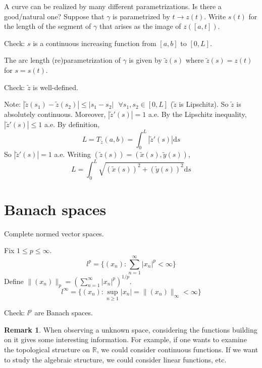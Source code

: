 \documentclass{article}
\newcommand{\sfa}{\text{  } \forall}
\theoremstyle{definition}
\newtheorem{rem}{Remark}
\begin{document}
A curve can be realized by many different parametrizations. Is there a good/natural one? Suppose that $\gamma$ is parametrized by $t \to z(t)$. Write $s(t)$ for the length of the segment of $\gamma$ that arises as the image of $z([a, t])$. 

\par Check: $s$ is a continuous increasing function from $[a, b]$ to $[0, L]$. 

\par The arc length (re)parametrization of $\gamma$ is given by $\tilde{z}(s)$ where $\tilde{z}(s) = z(t)$ for $s = s(t)$. 

\par Check: $\tilde{z}$ is well-defined. 

\par Note: $|\tilde{z}(s_1) - \tilde{z}(s_2)| \leq |s_1 - s_2| \sfa s_1, s_2 \in [0, L]$ ($\tilde{z}$ is Lipschitz). So $\tilde{z}$ is absolutely continuous. Moreover, $|\tilde{z}'(s)| = 1$ a.e. By the Lipschitz inequality, $|\tilde{z}'(s)| \leq 1$ a.e. By definition, 
\[
  L = T_{\tilde{z}}(a, b) = \int_0^L |\tilde{z}'(s)| \mathrm{d} s
\]
So $|\tilde{z}'(s)| = 1$ a.e. Writing $(\tilde{z}(s)) = (\tilde{x}(s), \tilde{y}(s))$, 
\[
  L = \int_0^L \sqrt{(\tilde{x}(s))^2 + (\tilde{y}(s))^2} \mathrm{d} s
\]

\section{Banach spaces}

\par Complete normed vector spaces. 

\par Fix $1 \leq p \leq \infty$. 
\[
  l^p = \{(x_n): \sum_{n = 1}^\infty |x_n|^p < \infty \}
\]
Define $\|(x_n)\|_{p} = (\sum_{n = 1}^\infty |x_n|^p)^{1/p}$. 
\[
  l^\infty = \{(x_n): \sup_{n \geq 1} |x_n| = \|(x_n)\|_{\infty} < \infty\}
\]

\par Check: $l^p$ are Banach spaces.

\begin{rem}
  When observing a unknown space, considering the functions building on it gives some interesting information. For example, if one wants to examine the topological structure on $\mathbb{R}$, we could consider continuous functions. If we want to study the algebraic structure, we could consider linear functions, etc. 
\end{rem}
\end{document}
